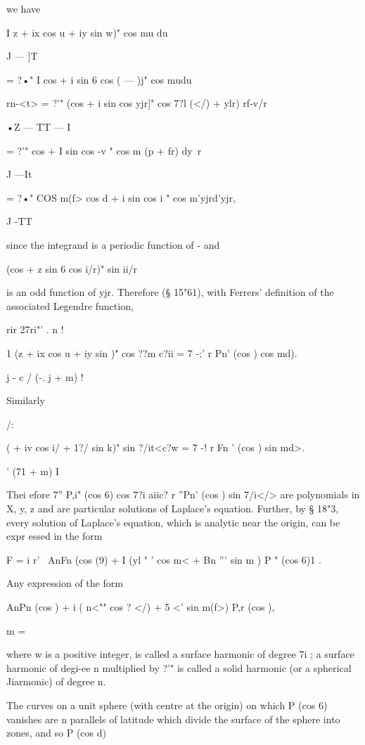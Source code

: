 we have 

I  z + ix cos u + iy sin w)" cos mu du 

J — ]T 

= ?•" I  cos   + i sin 6 cos (  —  )j" cos mudu 

rn-<t> 
= ?'" (cos + i sin   cos yjr]" cos 7?l (</) + ylr) rf-v/r 

•Z — TT — I  

= ?'"  cos   + I sin   cos -v  " cos m  (p +  fr) dy\ r 

J —It 

= ?•" COS m(f>  cos d + i sin cos i  "  cos m'yjrd'yjr, 

J -TT 

since the integrand is a periodic function of -  and 

(cos   + z sin 6 cos i/r)" sin  ii/r 

is an odd function of yjr. Therefore (§ 15"61), with Ferrers' definition of the 
associated Legendre function, 

rir 27ri"' . n ! 

1 (z + ix cos u + iy sin  )" cos ??m c?ii = 7  -;' r Pn'  (cos  ) cos md). 

j -  c / (-. j + m) ! 

Similarly 



/: 



(  + iv cos i/ + 1?/ sin k)" sin ?/it<c?w = 7  -! r Fn '  (cos  ) sin md>. 

'  (71 + m) I 



Thei efore 7'' P,i"  (cos 6) cos 7?i  aiic? r ''Pn'  (cos  ) sin 7/i</> are polynomials 
in X, y, z and are particular solutions of Laplace's equation. Further, by 
§ 18"3, every solution of Laplace's equation, which is analytic near the origin, 
can be expr essed in the form 

F = i r'  \ AnFn (cos (9) + I (yl " ' cos m<  + Bn '''  sin m ) P "  (cos 6)1 . 

Any expression of the form 

AnPn (cos  ) + i ( n<"" cos ? </) + 5 <'   sin m(f>) P,r (cos  ), 

m = \ 

where w is a positive integer, is called a surface harmonic of degree 7i ; 
a surface harmonic of degi-ee n multiplied by ?'" is called a solid harmonic 
(or a spherical Jiarmonic) of degree n. 

The curves on a unit sphere (with centre at the origin) on which P  (cos 6) vanishes 
are n parallels of latitude which divide the surface of the sphere into zones, and so P  (cos d) 

